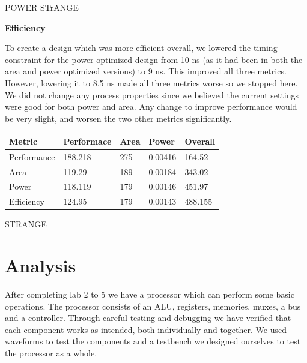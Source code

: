 \documentclass[a4paper,11pt]{article}
\begin{document}

POWER STrANGE

\textbf{Efficiency}

To create a design which was more efficient overall, we lowered the timing constraint for the power optimized design from 10 ns (as it had been in both the area and power optimized versions) to 9 ns. This improved all three metrics. However, lowering it to 8.5 ns made all three metrics worse so we stopped here. We did not change any process properties since we believed the current settings were good for both power and area. Any change to improve performance would be very slight, and worsen the two other metrics significantly.

\begin{table}[h!]
  \begin{tabular}{|l||l|l|l|l|} \hline
  Metric & Performace & Area & Power & Overall \\ \hline
  Performance & 188.218 & 275 & 0.00416 & 164.52 \\
  Area & 119.29 & 189 &0.00184 & 343.02 \\
  Power & 118.119 & 179 & 0.00146 & 451.97 \\
  Efficiency & 124.95 & 179 & 0.00143 & 488.155\\ \hline
  \end{tabular}
\end{table}

STRANGE

\newpage
\section{Analysis}

After completing lab 2 to 5 we have a processor which can perform some basic operations. The processor consists of an ALU, registers, memories, muxes, a bus and a controller. Through careful testing and debugging we have verified that each component works as intended, both individually and together. We used waveforms to test the components and a testbench we designed ourselves to test the processor as a whole.
\end{document}
